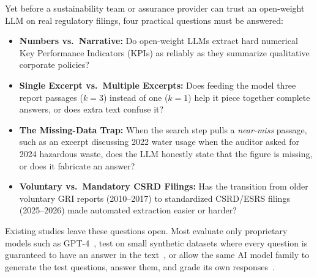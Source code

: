 \documentclass[11pt,letterpaper]{article}
\begin{document}
Yet before a sustainability team or assurance provider can trust an open-weight LLM on real regulatory filings, four practical questions must be answered:
\begin{itemize}[leftmargin=1.5em, itemsep=2pt]
  \item \textbf{Numbers vs.\ Narrative:} Do open-weight LLMs extract hard numerical Key Performance Indicators (KPIs) as reliably as they summarize qualitative corporate policies?
  \item \textbf{Single Excerpt vs.\ Multiple Excerpts:} Does feeding the model three report passages ($k=3$) instead of one ($k=1$) help it piece together complete answers, or does extra text confuse it?
  \item \textbf{The Missing-Data Trap:} When the search step pulls a \textit{near-miss} passage, such as an excerpt discussing 2022 water usage when the auditor asked for 2024 hazardous waste, does the LLM honestly state that the figure is missing, or does it fabricate an answer?
  \item \textbf{Voluntary vs.\ Mandatory CSRD Filings:} Has the transition from older voluntary GRI reports (2010--2017) to standardized CSRD/ESRS filings (2025--2026) made automated extraction easier or harder?
\end{itemize}

Existing studies leave these questions open. Most evaluate only proprietary models such as GPT-4~\citep{zou2025esgreveal}, test on small synthetic datasets where every question is guaranteed to have an answer in the text~\citep{saad2026empirical}, or allow the same AI model family to generate the test questions, answer them, and grade its own responses~\citep{es2024ragas,gu2024survey}.
\end{document}
